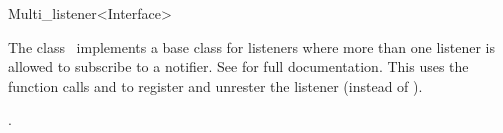 

\begin{ccRefClass}{Multi_listener<Interface>}  %


\ccDefinition
  
The class \ccRefName\ implements a base class for listeners where more
than one listener is allowed to subscribe to a notifier. See
 for full documentation. This uses the function calls
 and  to register and
unrester the listener (instead of ).


\ccSeeAlso

.

\end{ccRefClass}


